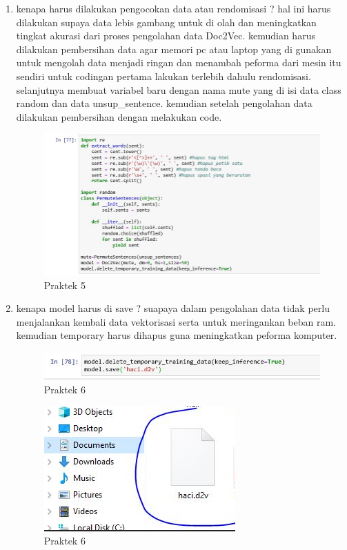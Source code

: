 \begin{enumerate}
\item kenapa harus dilakukan pengocokan data atau rendomisasi ? hal ini harus dilakukan supaya data lebis gambang untuk di olah dan meningkatkan tingkat akurasi dari proses pengolahan data Doc2Vec. kemudian harus dilakukan pembersihan data agar memori pc atau laptop yang di gunakan untuk mengolah data menjadi ringan dan menambah peforma dari mesin itu sendiri untuk codingan pertama lakukan terlebih dahulu rendomisasi. selanjutnya membuat variabel baru dengan nama mute yang di isi data class random dan data unsup\_sentence. kemudian setelah pengolahan data dilakukan pembersihan dengan melakukan code.
\begin{figure}[ht]
\centering
\includegraphics[scale=0.6]{figures/1174012/chapter5/2,5.JPG}
\caption{Praktek 5}
\label{contoh}
\end{figure}

\item kenapa model harus di save ? suapaya dalam pengolahan data tidak perlu menjalankan kembali data vektorisasi serta untuk meringankan beban ram. kemudian temporary harus dihapus guna meningkatkan peforma komputer.
\begin{figure}[ht]
\centering
\includegraphics[scale=0.6]{figures/1174012/chapter5/2,6.JPG}
\caption{Praktek 6}
\label{contoh}
\end{figure}
\begin{figure}[ht]
\centering
\includegraphics[scale=0.6]{figures/1174012/chapter5/2,6,1.png}
\caption{Praktek 6}
\label{contoh}
\end{figure}


\end{enumerate}
